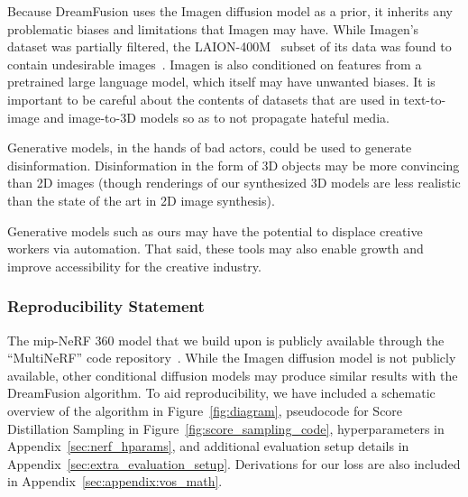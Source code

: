 \documentclass{article} \usepackage{iclr2023_conference,times}
\newcommand{\sname}{Score Distillation Sampling\xspace}
\newcommand{\dreamfusion}{DreamFusion\xspace}
\begin{document}
Because \dreamfusion uses the Imagen diffusion model as a prior, it inherits any problematic biases and limitations that Imagen may have. While Imagen's dataset was partially filtered, the LAION-400M~\citep{laion5b} subset of its data was found to contain undesirable images~\citep{multimodaldatasets}. Imagen is also conditioned on features from a pretrained large language model, which itself may have unwanted biases. It is important to be careful about the contents of datasets that are used in text-to-image and image-to-3D models so as to not propagate hateful media.

Generative models, in the hands of bad actors, could be used to generate disinformation. Disinformation in the form of 3D objects may be more convincing than 2D images (though renderings of our synthesized 3D models are less realistic than the state of the art in 2D image synthesis).


Generative models such as ours may have the potential to displace creative workers via automation. That said, these tools may also enable growth and improve accessibility for the creative industry.

\subsubsection*{Reproducibility Statement}

The mip-NeRF 360 model that we build upon is publicly available through the ``MultiNeRF'' code repository~\citep{multinerf2022}. While the Imagen diffusion model is not publicly available, other conditional diffusion models may produce similar results with the \dreamfusion algorithm. To aid reproducibility, we have included a schematic overview of the algorithm in Figure~\ref{fig:diagram}, pseudocode for \sname in Figure~\ref{fig:score_sampling_code}, hyperparameters in Appendix~\ref{sec:nerf_hparams}, and additional evaluation setup details in Appendix~\ref{sec:extra_evaluation_setup}. Derivations for our loss are also included in Appendix~\ref{sec:appendix:vos_math}.
\end{document}
